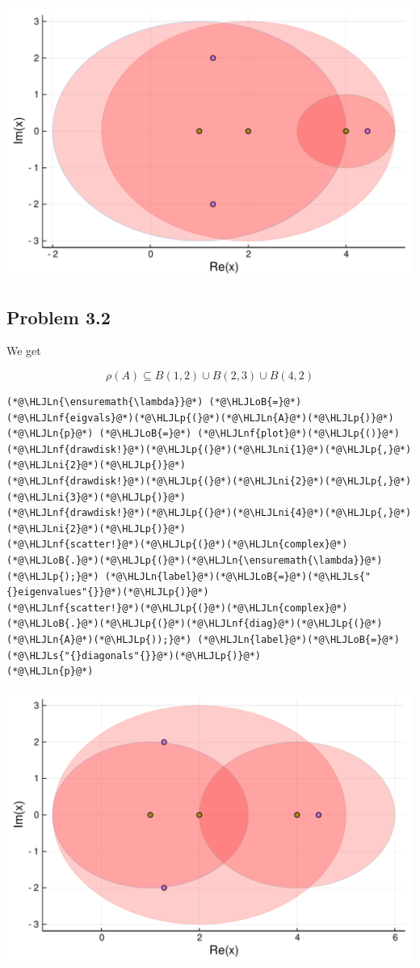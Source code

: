 \documentclass[12pt,a4paper]{article}
\newcommand{\HLJLn}[1]{#1}
\newcommand{\HLJLnf}[1]{\textcolor[RGB]{66,102,213}{#1}}
\newcommand{\HLJLs}[1]{\textcolor[RGB]{201,61,57}{#1}}
\newcommand{\HLJLni}[1]{\textcolor[RGB]{59,151,46}{#1}}
\newcommand{\HLJLoB}[1]{\textcolor[RGB]{102,102,102}{\textbf{#1}}}
\newcommand{\HLJLp}[1]{#1}
\begin{document}
\includegraphics[width=\linewidth]{figures/Solutions1_17_1.pdf}

\subsection{Problem 3.2}
We get 

\[
\rho(A) \subseteq B(1,2) \cup B(2,3) \cup B(4,2)
\]

\begin{lstlisting}
(*@\HLJLn{\ensuremath{\lambda}}@*) (*@\HLJLoB{=}@*) (*@\HLJLnf{eigvals}@*)(*@\HLJLp{(}@*)(*@\HLJLn{A}@*)(*@\HLJLp{)}@*)
(*@\HLJLn{p}@*) (*@\HLJLoB{=}@*) (*@\HLJLnf{plot}@*)(*@\HLJLp{()}@*)
(*@\HLJLnf{drawdisk!}@*)(*@\HLJLp{(}@*)(*@\HLJLni{1}@*)(*@\HLJLp{,}@*)(*@\HLJLni{2}@*)(*@\HLJLp{)}@*)
(*@\HLJLnf{drawdisk!}@*)(*@\HLJLp{(}@*)(*@\HLJLni{2}@*)(*@\HLJLp{,}@*)(*@\HLJLni{3}@*)(*@\HLJLp{)}@*)
(*@\HLJLnf{drawdisk!}@*)(*@\HLJLp{(}@*)(*@\HLJLni{4}@*)(*@\HLJLp{,}@*)(*@\HLJLni{2}@*)(*@\HLJLp{)}@*)
(*@\HLJLnf{scatter!}@*)(*@\HLJLp{(}@*)(*@\HLJLn{complex}@*)(*@\HLJLoB{.}@*)(*@\HLJLp{(}@*)(*@\HLJLn{\ensuremath{\lambda}}@*)(*@\HLJLp{);}@*) (*@\HLJLn{label}@*)(*@\HLJLoB{=}@*)(*@\HLJLs{"{}eigenvalues"{}}@*)(*@\HLJLp{)}@*)
(*@\HLJLnf{scatter!}@*)(*@\HLJLp{(}@*)(*@\HLJLn{complex}@*)(*@\HLJLoB{.}@*)(*@\HLJLp{(}@*)(*@\HLJLnf{diag}@*)(*@\HLJLp{(}@*)(*@\HLJLn{A}@*)(*@\HLJLp{));}@*) (*@\HLJLn{label}@*)(*@\HLJLoB{=}@*)(*@\HLJLs{"{}diagonals"{}}@*)(*@\HLJLp{)}@*)
(*@\HLJLn{p}@*)
\end{lstlisting}

\includegraphics[width=\linewidth]{figures/Solutions1_18_1.pdf}
\end{document}
